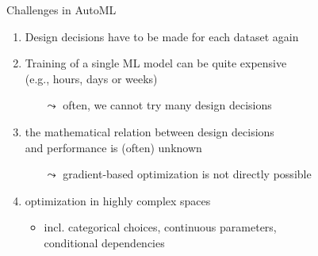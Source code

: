 \begin{frame}[c]{Challenges in AutoML}

\begin{enumerate}
  \item Design decisions have to be made for each dataset again
  \smallskip
  \pause
  \item Training of a single ML model can be quite expensive\\
  		(e.g., hours, days or weeks)
  \begin{itemize}
    \item[$\leadsto$] often, we cannot try many design decisions
  \end{itemize}
  \smallskip
  \pause
  \item the mathematical relation between design decisions\\ and performance is (often) unknown
  \begin{itemize}
    \item[$\leadsto$] gradient-based optimization is not directly possible
  \end{itemize}
  \smallskip
  \pause
  \item optimization in highly complex spaces
  \begin{itemize}
    \item incl. categorical choices, continuous parameters,\\ conditional dependencies
  \end{itemize}
  
\end{enumerate}

\end{frame}
